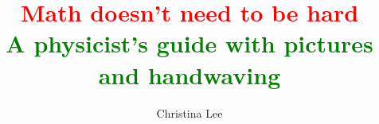 \documentclass[12pt]{book}
\title{\textcolor{red}{Math doesn't need to be hard}\\
\textcolor{green}{\large A physicist's guide with pictures and handwaving}}
\author{Christina Lee}
\begin{document}


\pagecolor{base03}
\color{base1}
\maketitle


\tableofcontents


%











%

\begin{appendices}

\end{appendices}
%
%
\end{document}
